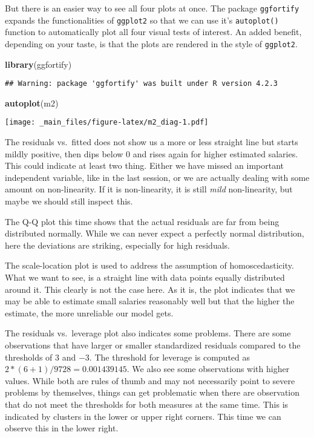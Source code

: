 \documentclass[
]{book}
\newenvironment{Shaded}{\begin{snugshade}}{\end{snugshade}}
\newcommand{\FunctionTok}[1]{\textcolor[rgb]{0.13,0.29,0.53}{\textbf{#1}}}
\newcommand{\NormalTok}[1]{#1}
\begin{document}
But there is an easier way to see all four plots at once. The package
\texttt{ggfortify} expands the functionalities of \texttt{ggplot2} so that we can use it's
\texttt{autoplot()} function to automatically plot all four visual tests of interest.
An added benefit, depending on your taste, is that the plots are rendered in the
style of \texttt{ggplot2}.

\begin{Shaded}
\begin{Highlighting}[]
\FunctionTok{library}\NormalTok{(ggfortify)}
\end{Highlighting}
\end{Shaded}

\begin{verbatim}
## Warning: package 'ggfortify' was built under R version 4.2.3
\end{verbatim}

\begin{Shaded}
\begin{Highlighting}[]
\FunctionTok{autoplot}\NormalTok{(m2)}
\end{Highlighting}
\end{Shaded}

\texttt{[image: \_main\_files/figure-latex/m2\_diag-1.pdf]}

The residuals vs.~fitted does not show us a more or less straight line but
starts mildly positive, then dips below \(0\) and rises again for higher estimated
salaries. This could indicate at least two thing. Either we have missed an
important independent variable, like in the last session, or we are actually
dealing with some amount on non-linearity. If it is non-linearity, it is still
\emph{mild} non-linearity, but maybe we should still inspect this.

The Q-Q plot this time shows that the actual residuals are far from being
distributed normally. While we can never expect a perfectly normal distribution,
here the deviations are striking, especially for high residuals.

The scale-location plot is used to address the assumption of homoscedasticity.
What we want to see, is a straight line with data points equally distributed
around it. This clearly is not the case here. As it is, the plot indicates
that we may be able to estimate small salaries reasonably well but that the
higher the estimate, the more unreliable our model gets.

The residuals vs.~leverage plot also indicates some problems. There are some
observations that have larger or smaller standardized residuals compared to the
thresholds of \(3\) and \(-3\). The threshold for leverage is computed as
\(2 * (6 + 1) / 9728 = 0.001439145\). We also see some observations with higher
values. While both are rules of thumb and may not necessarily point to severe
problems by themselves, things can get problematic when there are observation
that do not meet the thresholds for both measures at the same time. This is
indicated by clusters in the lower or upper right corners. This time we can
observe this in the lower right.
\end{document}
